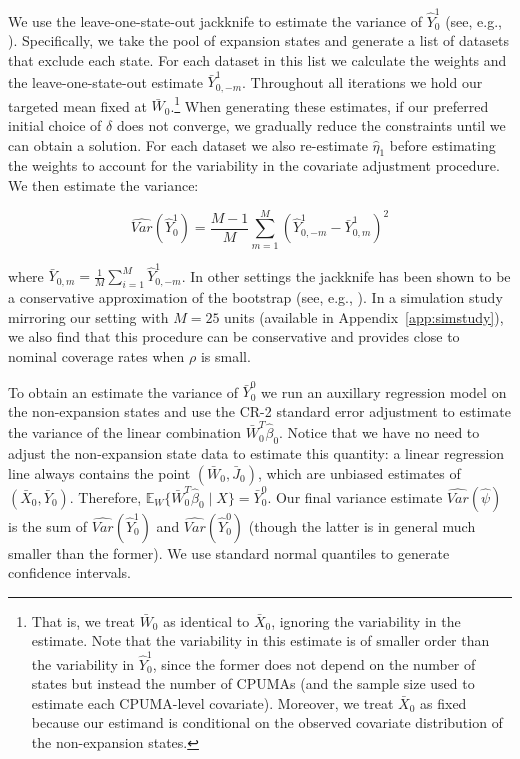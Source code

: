\documentclass[aoas]{imsart}
\theoremstyle{plain}
\theoremstyle{remark}
\begin{document}
We use the leave-one-state-out jackknife to estimate the variance of $\hat{Y}_0^1$ (see, e.g., \cite{cameron2015practitioner}). Specifically, we take the pool of expansion states and generate a list of datasets that exclude each state. For each dataset in this list we calculate the weights and the leave-one-state-out estimate $\bar{Y}^1_{0, -m}$. Throughout all iterations we hold our targeted mean fixed at $\bar{W}_0$.\footnote{That is, we treat $\bar{W}_0$ as identical to $\bar{X}_0$, ignoring the variability in the estimate. Note that the variability in this estimate is of smaller order than the variability in $\hat{Y}_0^1$, since the former does not depend on the number of states but instead the number of CPUMAs (and the sample size used to estimate each CPUMA-level covariate). Moreover, we treat $\bar{X}_0$ as fixed because our estimand is conditional on the observed covariate distribution of the non-expansion states.} When generating these estimates, if our preferred initial choice of $\delta$ does not converge, we gradually reduce the constraints until we can obtain a solution. For each dataset we also re-estimate $\hat{\eta}_1$ before estimating the weights to account for the variability in the covariate adjustment procedure. We then estimate the variance:

\begin{equation}
    \hat{Var}(\hat{Y}_0^1) = \frac{M - 1}{M}\sum_{m = 1}^M(\hat{Y}^1_{0,-m} - \bar{Y}^1_{0, m})^2
\end{equation}

where $\bar{Y}_{0, m} = \frac{1}{M}\sum_{i=1}^M\hat{Y}^1_{0, -m}$. In other settings the jackknife has been shown to be a conservative approximation of the bootstrap (see, e.g., \cite{efron1981jackknife}). In a simulation study mirroring our setting with $M = 25$ units (available in Appendix~\ref{app:simstudy}), we also find that this procedure can be conservative and provides close to nominal coverage rates when $\rho$ is small.

To obtain an estimate the variance of $\bar{Y}_0^0$ we run an auxillary regression model on the non-expansion states and use the CR-2 standard error adjustment to estimate the variance of the linear combination $\bar{W}_0^T\hat{\beta}_0$. Notice that we have no need to adjust the non-expansion state data to estimate this quantity: a linear regression line always contains the point $(\bar{W}_0, \bar{J}_0)$, which are unbiased estimates of $(\bar{X}_0, \bar{Y}_0)$. Therefore, $\mathbb{E}_W\{\bar{W}_0^T\hat{\beta}_0 \mid X\} = \bar{Y}_0^0$. Our final variance estimate $\hat{Var}(\hat{\psi})$ is the sum of $\hat{Var}(\hat{Y}_0^1)$ and $\hat{Var}(\hat{Y}_0^0)$ (though the latter is in general much smaller than the former). We use standard normal quantiles to generate confidence intervals. 
\end{document}
